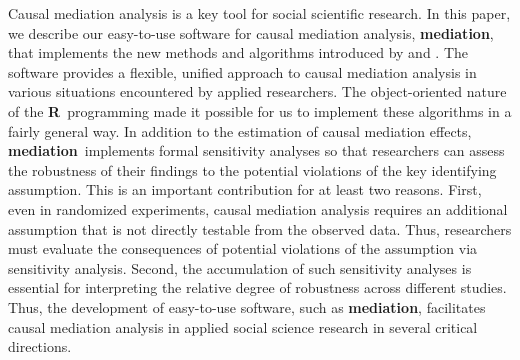 \documentclass[11pt,letterpaper]{article}
\theoremstyle{plain}
\newcommand\bR{{\bf R}}
\newcommand\bmediation{{\bf mediation}}
\begin{document}
Causal mediation analysis is a key tool for social scientific
research. In this paper, we describe our easy-to-use software for
causal mediation analysis, \bmediation, that implements the new
methods and algorithms introduced by \citet*{imai:keel:yama:10} and
\citet*{imai:keel:ting:10}.  The software provides a flexible, unified
approach to causal mediation analysis in various situations
encountered by applied researchers.  The object-oriented nature of the
\bR\ programming made it possible for us to implement these algorithms
in a fairly general way.  In addition to the estimation of causal
mediation effects, \bmediation\ implements formal sensitivity analyses
so that researchers can assess the robustness of their findings to the
potential violations of the key identifying assumption.  This is an
important contribution for at least two reasons.  First, even in
randomized experiments, causal mediation analysis requires an
additional assumption that is not directly testable from the observed
data.  Thus, researchers must evaluate the consequences of potential
violations of the assumption via sensitivity analysis.  Second, the
accumulation of such sensitivity analyses is essential for
interpreting the relative degree of robustness across different
studies.  Thus, the development of easy-to-use software, such as
\bmediation, facilitates causal mediation analysis in applied social
science research in several critical directions.


\clearpage
{}

\end{document}
